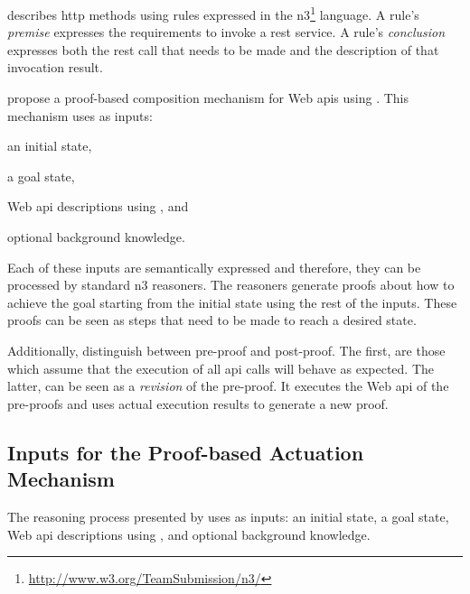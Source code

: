 \restdesc{} describes \acs{http} methods using rules expressed in the \ac{n3}\footnote{\url{http://www.w3.org/TeamSubmission/n3/}} language.
A rule's \emph{premise} expresses the requirements to invoke a \ac{rest} service.
A rule's \emph{conclusion} expresses both the \ac{rest} call that needs to be made and the description of that invocation result.


\citet{verborgh_ijcs_2014} propose a proof-based composition mechanism for Web \acp{api} using \restdesc{}.
This mechanism uses as inputs:
\begin{enumerate*}[label=\itshape(\arabic*\upshape)]
  \item an initial state,
  \item a goal state,
  \item Web \ac{api} descriptions using \restdesc{}, and
  \item optional background knowledge.
\end{enumerate*}
Each of these inputs are semantically expressed and therefore, they can be processed by standard \ac{n3} reasoners.
The reasoners generate proofs about how to achieve the goal starting from the initial state using the rest of the inputs.
These proofs can be seen as steps that need to be made to reach a desired state.


Additionally, \citet{verborgh_ijcs_2014} distinguish between pre-proof and post-proof.
The first, are those which assume that the execution of all \acs{api} calls will behave as expected.
The latter, can be seen as a \emph{revision} of the pre-proof.
It executes the Web \acs{api} of the pre-proofs and uses actual execution results to generate a new proof.



\subsection{Inputs for the Proof-based Actuation Mechanism}
\label{sec:inputs_proof}

The reasoning process presented by \citet{verborgh_ijcs_2014} uses as inputs: %
an initial state,
a goal state,
Web \ac{api} descriptions using \restdesc{}, and
optional background knowledge.


